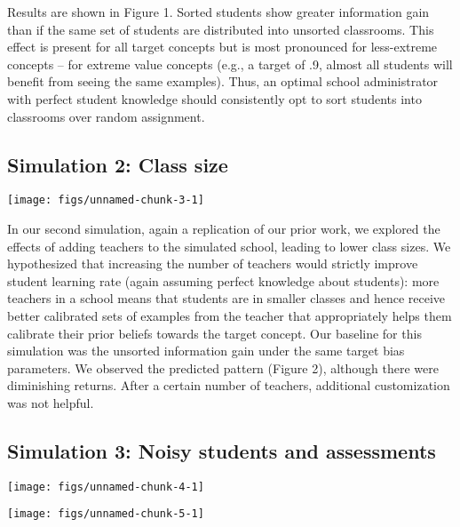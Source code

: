 \documentclass[10pt, letterpaper]{article}
\newenvironment{CodeChunk}{}{}
\begin{document}
Results are shown in Figure 1. Sorted students show greater information
gain than if the same set of students are distributed into unsorted
classrooms. This effect is present for all target concepts but is most
pronounced for less-extreme concepts -- for extreme value concepts
(e.g., a target of .9, almost all students will benefit from seeing the
same examples). Thus, an optimal school administrator with perfect
student knowledge should consistently opt to sort students into
classrooms over random assignment.

\subsection{Simulation 2: Class size}\label{simulation-2-class-size}

\begin{CodeChunk}

\texttt{[image: figs/unnamed-chunk-3-1]} \end{CodeChunk}

In our second simulation, again a replication of our prior work, we
explored the effects of adding teachers to the simulated school, leading
to lower class sizes. We hypothesized that increasing the number of
teachers would strictly improve student learning rate (again assuming
perfect knowledge about students): more teachers in a school means that
students are in smaller classes and hence receive better calibrated sets
of examples from the teacher that appropriately helps them calibrate
their prior beliefs towards the target concept. Our baseline for this
simulation was the unsorted information gain under the same target bias
parameters. We observed the predicted pattern (Figure 2), although there
were diminishing returns. After a certain number of teachers, additional
customization was not helpful.

\subsection{Simulation 3: Noisy students and
assessments}\label{simulation-3-noisy-students-and-assessments}

\begin{CodeChunk}

\texttt{[image: figs/unnamed-chunk-4-1]} \end{CodeChunk}

\begin{CodeChunk}

\texttt{[image: figs/unnamed-chunk-5-1]} \end{CodeChunk}
\end{document}
